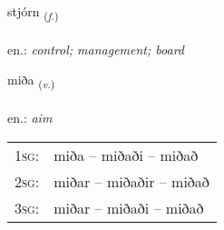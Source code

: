 \documentclass[frontgrid, backgrid]{flacards}\usepackage[]{graphicx}\usepackage[]{xcolor}
\begin{document}
\renewcommand{\flhead}{\vskip5pt \fboxsep=0pt {\small\bfseries\footnotesize Nafnorð | Noun}}
\renewcommand{\fcfoot}{\vskip5pt \fboxsep=0pt \hspace{2pt}{\small\bfseries\footnotesize 1K}}

\renewcommand{\blhead}{\vskip5pt {\small\bfseries\footnotesize Nafnorð | Noun }}
\renewcommand{\bcfoot}{\vskip5pt \hspace{2pt}{\small\bfseries\footnotesize 1K}}


{stjórn \small{\textsubscript{(\textit{f.})}} \\[1ex] %
\textphonetic{[stjourtn̥]} \\
en.: \emph{control; management; board} \\  [2ex]
\renewcommand*{\arraystretch}{0.8}
}

\renewcommand{\flhead}{\vskip5pt \fboxsep=0pt {\small\bfseries\footnotesize Sagnorð | Verb}}
\renewcommand{\fcfoot}{\vskip5pt \fboxsep=0pt \hspace{2pt}{\small\bfseries\footnotesize 1K}}

\renewcommand{\blhead}{\vskip5pt {\small\bfseries\footnotesize Sagnorð | Verb }}
\renewcommand{\bcfoot}{\vskip5pt \hspace{2pt}{\small\bfseries\footnotesize 1K}}


{miða \small{\textsubscript{(\textit{v.})}} \\[1ex] %
\textphonetic{[mɪːða]} \\
en.: \emph{aim} \\  [2ex]
\renewcommand*{\arraystretch}{0.8}
\begin{tabular}{p{1cm}l}
\textsc{1sg}: & miða -- miðaði -- miðað \\ 
\textsc{2sg}: & miðar -- miðaðir -- miðað \\ 
\textsc{3sg}: & miðar -- miðaði -- miðað \\ 
\end{tabular}
}
\end{document}
